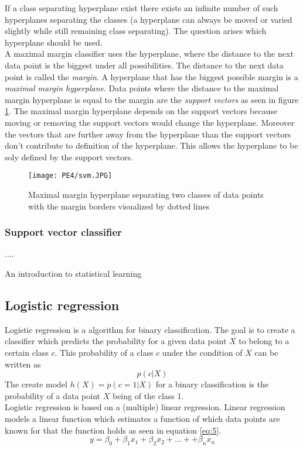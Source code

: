 If a class separating hyperplane exist there exists an infinite number of such hyperplanes separating the classes (a hyperplane can always be moved or varied slightly while still remaining class separating). The question arises which hyperplane should be used. 
\\
A maximal margin classifier uses the hyperplane, where the distance to the next data point  is the biggest under all possibilities. The distance to the next data point is called the \emph{margin}. A hyperplane that has the biggest possible margin is a \emph{maximal margin hyperplane}. Data points where the distance to the maximal margin hyperplane is equal to the margin are the \emph{support vectors} as seen in figure \ref{fig:mmh}. The maximal margin hyperplane depends on the support vectors because moving or removing the support vectors would change the hyperplane. Moreover the vectors that are further away from the hyperplane than the support vectors don't contribute to definition of the hyperplane. This allows the hyperplane to be soly defined by the support vectors.

\begin{figure}[h]
\centering
\texttt{[image: PE4/svm.JPG]}
\caption{Maximal margin hyperplane separating two classes of data points with the margin borders visualized by dotted lines}
\label{fig:mmh}
\end{figure}


\subsubsection{Support vector classifier}

....


An introduction to statistical learning

\subsection{Logistic regression}

Logistic regression is a algorithm for binary classification. The goal is to create a classifier which predicts the probability for a given data point $X$ to belong to a certain class $c$. This probability	 of a class $c$ under the condition of $X$ can be written as
\begin{equation} \label{eq:4}
p(c|X)
\end{equation}
The create model $h(X)=p(c=1|X)$  for a binary classification is the probability of a data point $X$ being of the class 1.
\\
Logistic regression is based on a (multiple) linear regression. Linear regression models a linear function which estimates a function of which data points are known for that the function holds as seen in equation \ref{eq:5}. 
\begin{equation} \label{eq:5}
y=\beta_0 + \beta_1 x_1 + \beta_2 x_2 + ... + + \beta_n x_n
\end{equation}

